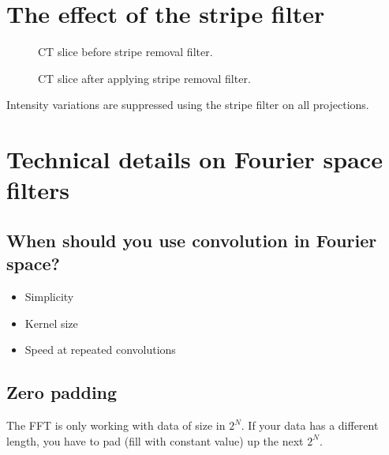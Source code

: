 \documentclass[letterpaper,10pt,english]{sphinxmanual}
\begin{document}
\noindent{}


\section{The effect of the stripe filter}
\label{\detokenize{02-ImageEnhancement:the-effect-of-the-stripe-filter}}
\begin{figure}[htbp]
\centering
\capstart

\noindent{}
\caption{CT slice before stripe removal filter.}\label{\detokenize{02-ImageEnhancement:id15}}\end{figure}

\begin{figure}[htbp]
\centering
\capstart

\noindent{}
\caption{CT slice after applying stripe removal filter.}\label{\detokenize{02-ImageEnhancement:id16}}\end{figure}



\sphinxAtStartPar
Intensity variations are suppressed using the stripe filter on all projections.


\section{Technical details on Fourier space filters}
\label{\detokenize{02-ImageEnhancement:technical-details-on-fourier-space-filters}}

\subsection{When should you use convolution in Fourier space?}
\label{\detokenize{02-ImageEnhancement:when-should-you-use-convolution-in-fourier-space}}\begin{itemize}
\item {} 
\sphinxAtStartPar
Simplicity

\item {} 
\sphinxAtStartPar
Kernel size

\item {} 
\sphinxAtStartPar
Speed at repeated convolutions

\end{itemize}


\subsection{Zero padding}
\label{\detokenize{02-ImageEnhancement:zero-padding}}
\sphinxAtStartPar
The FFT is only working with data of size in \(2^N\). If your data has a different length, you have to pad (fill with constant value) up the next \(2^N\).
\end{document}

